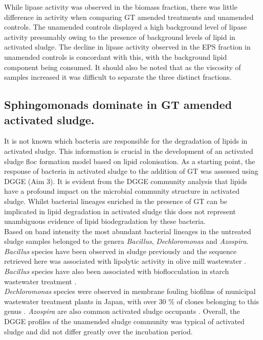 \documentclass[twoside]{article}
\begin{document}
While lipase activity was observed in the biomass fraction, there was little difference in activity when comparing GT amended treatments and unamended controls. The unamended controls displayed a high background level of lipase activity presumably owing to the presence of background levels of lipid in activated sludge. The decline in lipase activity observed in the EPS fraction in unamended controls is concordant with this, with the background lipid component being consumed. It should also be noted that as the viscosity of samples increased it was difficult to separate the three distinct fractions.

\subsection{Sphingomonads dominate in GT amended activated sludge.}
It is not known which bacteria are responsible for the degradation of lipids in activated sludge. This information is crucial in the development of an activated sludge floc formation model based on lipid colonisation. As a starting point, the response of bacteria in activated sludge to the addition of GT was assessed using DGGE (Aim 3). It is evident from the DGGE community analysis that lipids have a profound impact on the microbial community structure in activated sludge. Whilst bacterial lineages enriched in the presence of GT can be implicated in lipid degradation in activated sludge this does not represent unambiguous evidence of lipid biodegradation by these bacteria.\\

Based on band intensity the most abundant bacterial lineages in the untreated sludge samples belonged to the genera \emph{Bacillus}, \emph{Dechloromonas} and \emph{Azospira}. \emph{Bacillus} species have been observed in sludge previously and the sequence retrieved here was associated with lipolytic activity in olive mill wastewater \cite{ertuugrul2007isolation}. \emph{Bacillus} species have also been associated with bioflocculation in starch wastewater treatment \cite{deng2003characteristics}.\\

\emph{Dechloromonas} species were observed in membrane fouling biofilms of municipal wastewater treatment plants in Japan, with over 30 \% of clones belonging to this genus \cite{miura2007membrane}. \emph{Azospira} are also common activated sludge occupants \cite{tan2003dechlorosoma,reinhold2000reassessment,hunter2007azospira,wilhelmus2013microbiological}.
Overall, the DGGE profiles of the unamended sludge community was typical of activated sludge and did not differ greatly over the incubation period.\\
\end{document}
